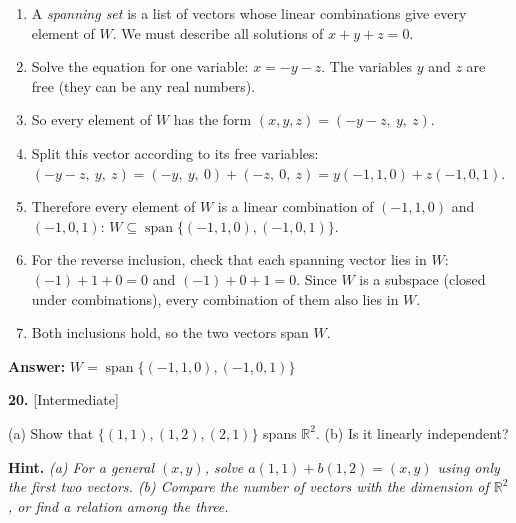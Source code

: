 \documentclass[11pt]{article}
\begin{document}
\begin{tcolorbox}[breakable,colback=ans,colframe=ansb,boxrule=0.5pt,left=4pt,right=4pt,top=2pt,bottom=2pt]\begin{enumerate}[leftmargin=2.2em,itemsep=1pt,topsep=1pt,label=\textbf{Step \arabic*.}]\item A \emph{spanning set} is a list of vectors whose linear combinations give every element of $W$. We must describe all solutions of $x+y+z=0$.
\item Solve the equation for one variable: $x=-y-z$. The variables $y$ and $z$ are free (they can be any real numbers).
\item So every element of $W$ has the form $(x,y,z)=(-y-z,\ y,\ z)$.
\item Split this vector according to its free variables: $(-y-z,\ y,\ z)=(-y,\ y,\ 0)+(-z,\ 0,\ z)=y(-1,1,0)+z(-1,0,1)$.
\item Therefore every element of $W$ is a linear combination of $(-1,1,0)$ and $(-1,0,1)$: $W\subseteq\operatorname{span}\{(-1,1,0),(-1,0,1)\}$.
\item For the reverse inclusion, check that each spanning vector lies in $W$: $(-1)+1+0=0$ and $(-1)+0+1=0$. Since $W$ is a subspace (closed under combinations), every combination of them also lies in $W$.
\item Both inclusions hold, so the two vectors span $W$.
\end{enumerate}\textbf{Answer:} $W=\operatorname{span}\{(-1,1,0),(-1,0,1)\}$\end{tcolorbox}
\par\vspace{2pt}
\begin{minipage}{\linewidth}\textbf{20.} \hfill{\scriptsize\color{ink}[Intermediate]}\par\nopagebreak (a) Show that $\{(1,1),(1,2),(2,1)\}$ spans $\mathbb{R}^{2}$. (b) Is it linearly independent?
\par\smallskip\begingroup\small\color{ink}\textbf{Hint.} \textit{(a) For a general $(x,y)$, solve $a(1,1)+b(1,2)=(x,y)$ using only the first two vectors. (b) Compare the number of vectors with the dimension of $\mathbb{R}^2$, or find a relation among the three.}\endgroup
\end{minipage}\par\nopagebreak
\end{document}
